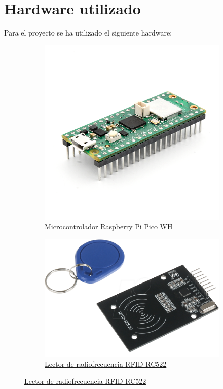 \documentclass{article}
\begin{document}
\section{Hardware utilizado}
Para el proyecto se ha utilizado el siguiente hardware:

\begin{figure}[!ht]
	\centering
	\begin{subfigure}[b]{0.45\textwidth}
		\includegraphics[width=\textwidth]{../images/picowh.png}
		\caption*{\href{https://www.raspberrypi.com/products/raspberry-pi-pico/}{Microcontrolador Raspberry Pi Pico WH}}
		\label{fig:picowh}
	\end{subfigure}
	\hfill
	\begin{subfigure}[b]{0.45\textwidth}
		\includegraphics[width=\textwidth]{../images/mfrc522.png}
		\caption*{\href{https://www.keyestudio.com/products/keyestudio-mfrc522-rfid-s50-fudan-card-ic-card-module-with-spi-port-for-arduino-uno-r3-mega-2560-r3}{Lector de radiofrecuencia RFID-RC522}}
		\label{fig:MFRC522}
	\end{subfigure}
\end{figure}
\end{document}
